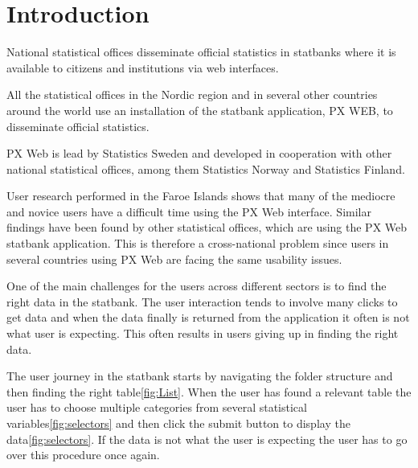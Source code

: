 \section*{Introduction}

National statistical offices disseminate official statistics in statbanks where it is available to citizens and institutions via web interfaces.
 
All the statistical offices in the Nordic region and in several other countries around the world use an installation of the statbank application, PX WEB, to disseminate official statistics.
 
PX Web is lead by Statistics Sweden and developed in cooperation with other national statistical offices, among them Statistics Norway and Statistics Finland.
 
User research performed in the Faroe Islands shows that many of the mediocre and novice users have a difficult time using the PX Web interface. Similar findings have been found by other statistical offices, which are using the PX Web statbank application. This is therefore a cross-national problem since users in several countries using PX Web are facing the same usability issues.
 
One of the main challenges for the users across different sectors is to find the right data in the statbank. The user interaction tends to involve many clicks to get data and when the data finally is returned from the application it often is not what user is expecting. This often results in users giving up in finding the right data.
 
The user journey in the statbank starts by navigating the folder structure and then finding the right table\ref{fig:List}. When the user has found a relevant table the user has to choose multiple categories from several statistical variables\ref{fig:selectors} and then click the submit button to display the data\ref{fig:selectors}. If the data is not what the user is expecting the user has to go over this procedure once again.

